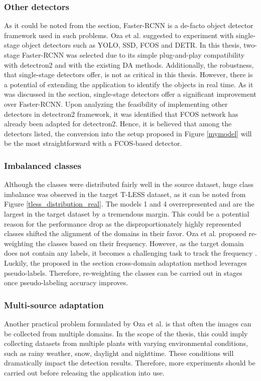 \documentclass[english, 12pt, a4paper, elec, utf8, a-1b, online]{aaltothesis}
\begin{document}
\subsubsection{Other detectors}
As it could be noted from the  section, Faster-RCNN is a de-facto object detector framework used in such problems. Oza et al. \cite{Oza2021} suggested to experiment with single-stage object detectors such as YOLO\cite{Redmon2015a}, SSD\cite{Liu2015}, FCOS\cite{Tian2019} and DETR\cite{Carion2020}. In this thesis, two-stage Faster-RCNN was selected due to its simple plug-and-play compatibility with detectron2\cite{wu2019detectron2} and with the existing DA methods. Additionally, the robustness, that single-stage detectors offer, is not as critical in this thesis. However, there is a potential of extending the application to identify the objects in real time. As it was discussed in the  section, single-stage detectors offer a significant improvement over Faster-RCNN. Upon analyzing the feasibility of implementing other detectors in detectron2 \cite{wu2019detectron2} framework, it was identified that FCOS network has already been adapted for detectron2. Hence, it is believed that among the detectors listed, the conversion into the setup proposed in Figure \ref{mymodel} will be the most straightforward with a FCOS-based detector. 

\subsubsection{Imbalanced classes}
Although the classes were distributed fairly well in the source dataset, huge class imbalance was observed in the target T-LESS dataset, as it can be noted from Figure \ref{tless_distribution_real}. The models 1 and 4 overrepresented and are the largest in the target dataset by a tremendous margin. This could be a potential reason for the performance drop as the disproportionately highly represented classes shifted the alignment of the domains in their favor. Oza et al. proposed re-weighting the classes based on their frequency. However, as the target domain does not contain any labels, it becomes a challenging task to track the frequency \cite{Oza2021}. Luckily, the proposed in the  section cross-domain adaptation method leverages pseudo-labels. Therefore, re-weighting the classes can be carried out in stages once pseudo-labeling accuracy improves. 

\subsubsection{Multi-source adaptation}
Another practical problem formulated by Oza et al. is that often the images can be collected from multiple domains. In the scope of the thesis, this could imply collecting datasets from multiple plants with varying environmental conditions, such as rainy weather, snow, daylight and nighttime. These conditions will dramatically impact the detection results. Therefore, more experiments should be carried out before releasing the application into use. 
\end{document}
